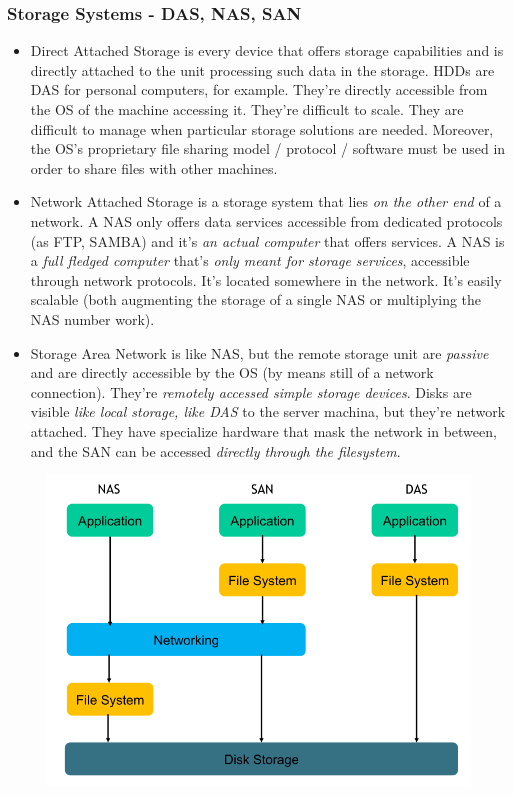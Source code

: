 \documentclass{article}
\begin{document}
				\subsubsection{Storage Systems - DAS, NAS, SAN}
					\begin{itemize}
						\item Direct Attached Storage is every device that offers storage capabilities and is directly attached to the unit processing such data in the storage. HDDs are DAS for personal computers, for example. They're directly accessible from the OS of the machine accessing it. They're difficult to scale. They are difficult to manage when particular storage solutions are needed. Moreover, the OS's proprietary file sharing model / protocol / software must be used in order to share files with other machines.
						\item Network Attached Storage is a storage system that lies \emph{on the other end} of a network. A NAS only offers data services accessible from dedicated protocols (as FTP, SAMBA) and it's \emph{an actual computer} that offers services. A NAS is a \emph{full fledged computer} that's \emph{only meant for storage services}, accessible through network protocols. It's located somewhere in the network. It's easily scalable (both augmenting the storage of a single NAS or multiplying the NAS number work).
						\item Storage Area Network is like NAS, but the remote storage unit are \emph{passive} and are directly accessible by the OS (by means still of a network connection). They're \emph{remotely accessed simple storage devices}. Disks are visible \emph{like local storage, like DAS} to the server machina, but they're network attached. They have specialize hardware that mask the network in between, and the SAN can be accessed \emph{directly through the filesystem}. 
					\end{itemize}
					\begin{figure}[H]
						\centering
						\includegraphics[width = \textwidth]{./images/storage.png}
					\end{figure}
					
\end{document}
